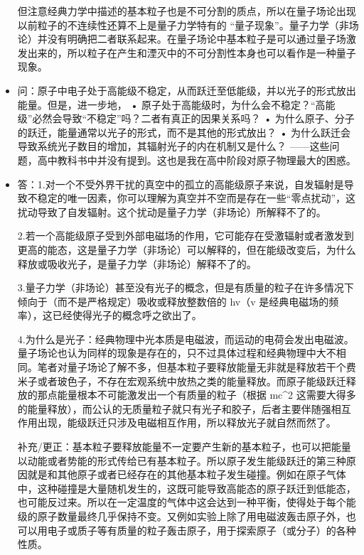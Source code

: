 \begin{itemize}
但注意经典力学中描述的基本粒子也是不可分割的质点，所以在量子场论出现以前粒子的不连续性还算不上是量子力学特有的 “量子现象”。量子力学（非场论）并没有明确把二者联系起来。在量子场论中基本粒子是可以通过量子场激发出来的，所以粒子在产生和湮灭中的不可分割性本身也可以看作是一种量子现象。

\item 问：原子中电子处于高能级不稳定，从而跃迁至低能级，并以光子的形式放出能量。但是，进一步地，
• 原子处于高能级时，为什么会不稳定？“高能级”必然会导致“不稳定”吗？二者有真正的因果关系吗？
• 为什么原子、分子的跃迁，能量通常以光子的形式，而不是其他的形式放出？
• 为什么跃迁会导致系统光子数目的增加，其辐射光子的内在机制又是什么？
——这些问题，高中教科书中并没有提到。这也是我在高中阶段对原子物理最大的困惑。
\item 答：1.对一个不受外界干扰的真空中的孤立的高能级原子来说，自发辐射是导致不稳定的唯一因素，你可以理解为真空并不空而是存在一些“零点扰动”，这扰动导致了自发辐射。这个扰动是量子力学（非场论）所解释不了的。

2.若一个高能级原子受到外部电磁场的作用，它可能存在受激辐射或者激发到更高的能态，这是量子力学（非场论）可以解释的，但在能级改变后，为什么释放或吸收光子，是量子力学（非场论）解释不了的。

3.量子力学（非场论）甚至没有光子的概念，但是有质量的粒子在许多情况下倾向于（而不是严格规定）吸收或释放整数倍的 hv（v 是经典电磁场的频率），这已经使得光子的概念呼之欲出了。

4.为什么是光子：经典物理中光本质是电磁波，而运动的电荷会发出电磁波。量子场论也认为同样的现象是存在的，只不过具体过程和经典物理中大不相同。笔者对量子场论了解不多，但基本粒子要释放能量无非就是释放若干个费米子或者玻色子，不存在宏观系统中放热之类的能量释放。而原子能级跃迁释放的那点能量根本不可能激发出一个有质量的粒子（根据 mc^2 这需要大得多的能量释放），而公认的无质量粒子就只有光子和胶子，后者主要伴随强相互作用出现，能级跃迁只涉及电磁相互作用，所以释放光子就自然而然了。

补充/更正：基本粒子要释放能量不一定要产生新的基本粒子，也可以把能量以动能或者势能的形式传给已有基本粒子。所以原子发生能级跃迁的第三种原因就是和其他原子或者已经存在的其他基本粒子发生碰撞。例如在原子气体中，这种碰撞是大量随机发生的，这既可能导致高能态的原子跃迁到低能态，也可能反过来。所以在一定温度的气体中这会达到一种平衡，使得处于每个能级的原子数量最终几乎保持不变。又例如实验上除了用电磁波轰击原子外，也可以用电子或质子等有质量的粒子轰击原子，用于探索原子（或分子）的各种性质。


\end{itemize}
